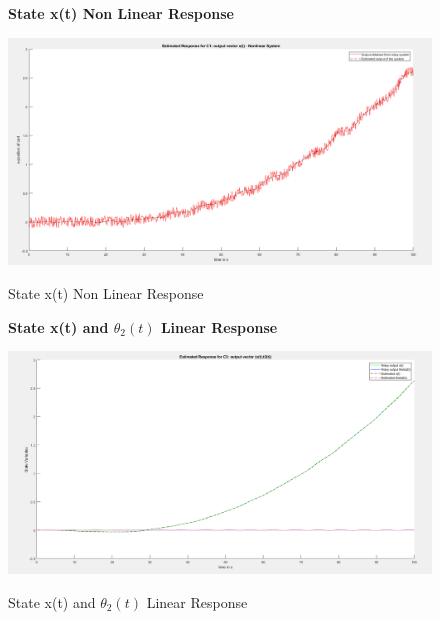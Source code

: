 \documentclass[12pt]{article}
\begin{document}
\begin{figure}[H]
    \centering
    \textbf{State x(t) Non Linear Response}\par\medskip
    \includegraphics[scale = 0.35]{StateXNonLinearResponse.png}\\[0.0 cm]	%
    \caption{State x(t) Non Linear Response} 
\end{figure}

\begin{figure}[H]
    \centering
    \textbf{State x(t) and $\theta_2(t)$ Linear Response}\par\medskip
    \includegraphics[scale = 0.35]{StateXth2LinearResponse.png}\\[0.0 cm]	%
    \caption{State x(t) and $\theta_2(t)$ Linear Response} 
\end{figure}
\end{document}
